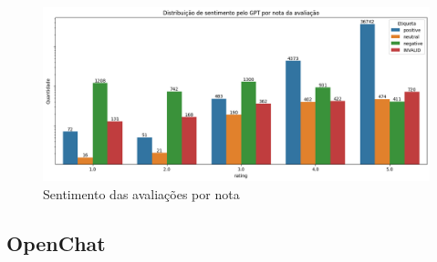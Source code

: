 \begin{figure}
	\centering
	\includegraphics[width=1\textwidth]{figs/gpt/sentimento_nota.png}
	\caption{Sentimento das avaliações por nota}
	\label{img:gpt_sentimento_nota}
\end{figure}


\subsection{OpenChat}







